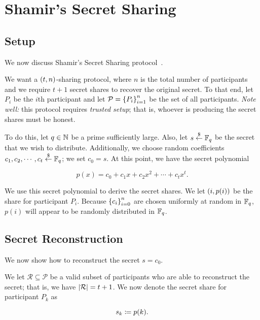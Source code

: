 \section{Shamir's Secret Sharing}
\label{sec:ss_shamir}

\subsection{Setup}

We now discuss Shamir's Secret Sharing protocol~\cite{shamir1979share}.

We want a $\left( t,n \right)$-sharing protocol,
where $n$ is the total number of participants
and we require $t+1$ secret shares to recover the original secret.
To that end, let $P_{i}$ be the $i$th participant
and let $\mathcal{P} = \left\{ P_{i} \right\}_{i=1}^{n}$ be the set
of all participants.
\emph{Note well:} this protocol requires \emph{trusted setup};
that is, whoever is producing the secret shares must be honest.

To do this, let $q\in\mathbb{N}$ be a prime sufficiently large.
Also, let $s\stackrel{\$}{\leftarrow}{}\mathbb{F}_{q}$ be the secret that we wish to distribute.
Additionally, we choose random coefficients
$c_{1}, c_{2}, \cdots, c_{t} \stackrel{\$}{\leftarrow}{} \mathbb{F}_{q}$;
we set $c_{0} = s$.
At this point, we have the secret polynomial

\begin{equation}
    p(x) = c_{0} + c_{1}x + c_{2}x^{2} + \cdots + c_{t}x^{t}.
\end{equation}

We use this secret polynomial to derive the secret shares.
We let $\left( i, p(i) \right)$ be the share for participant $P_{i}$.
Because $\left\{ c_{i} \right\}_{i=0}^{n}$ are chosen uniformly at random in $\mathbb{F}_{q}$,
$p(i)$ will appear to be randomly distributed in $\mathbb{F}_{q}$.

\subsection{Secret Reconstruction}

We now show how to reconstruct the secret $s = c_{0}$.

We let $\mathcal{R}\subseteq\mathcal{P}$
be a valid subset of participants who are able to reconstruct the secret;
that is, we have $\left| \mathcal{R} \right| = t+1$.
We now denote the secret share for participant $P_{k}$ as

\begin{equation}
    s_{k}\coloneqq{} p(k).
\end{equation}

